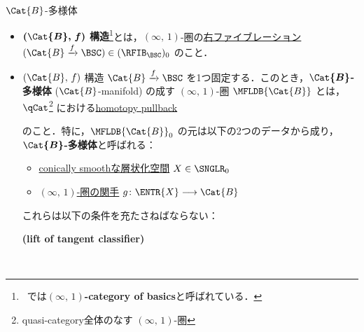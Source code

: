 \documentclass[TQFT_main]{subfiles}
\begin{document}
\begin{mydef}[label=def:B-mfld,breakable]{{$\Cat{B}$}-多様体}
    \begin{itemize}
        \item \textbf{$\bm{(\Cat{B},\, f)}$ 構造}\footnote{~\cite[Definition 1.1.6]{AFT2014stratified}では\textbf{$(\infty,\, 1)$-category of basics}と呼ばれている．}とは，$(\infty,\, 1)$-圏の\hyperref[def:infty-fib]{右ファイブレーション} $(\Cat{B} \xrightarrow{f} \BSC) \in (\RFIB_{\BSC})_0$ のこと．
        \item $(\Cat{B},\, f)$ 構造 $\Cat{B} \xrightarrow{f} \BSC$ を1つ固定する．このとき，\textbf{$\bm{\Cat{B}}$-多様体} ($\Cat{B}$-manifold) の成す $(\infty,\, 1)$-圏 $\MFLDB{\Cat{B}}$ とは，$\qCat$\footnote{quasi-category全体のなす $(\infty,\, 1)$-圏} における\hyperref[def:htpy-pullback]{homotopy pullback}
        \begin{center}
        \end{center}
        のこと．特に，$\MFLDB{\Cat{B}}_0$ の元は以下の2つのデータから成り，\textbf{$\bm{\Cat{B}}$-多様体}と呼ばれる：
        \begin{itemize}
            \item \hyperref[def:c-smooth]{conically smoothな層状化空間} $X \in \SNGLR_0$
            \item \hyperref[def:infty-1]{$(\infty,\, 1)$-圏の関手} $g \colon \ENTR{X} \lto \Cat{B}$
        \end{itemize}
        これらは以下の条件を充たさねばならない：
        \begin{description}
            \item[\textbf{(lift of tangent classifier)}]　
            

\end{description}
\end{itemize}
\end{mydef}
\end{document}
